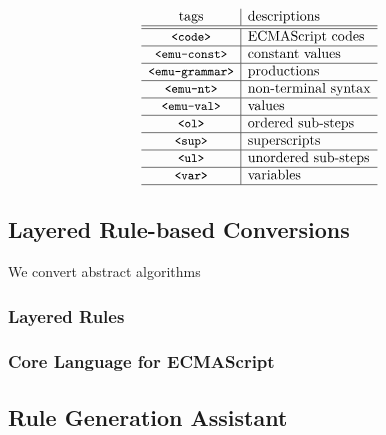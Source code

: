 \[
  \begin{array}{c|l}

    \text{tags} & \text{descriptions}\\\hline\hline
    \texttt{\small<code>} & \text{ECMAScript codes}\\\hline
    \texttt{\small<emu-const>} & \text{constant values}\\\hline
    \texttt{\small<emu-grammar>} & \text{productions}\\\hline
    \texttt{\small<emu-nt>} & \text{non-terminal syntax}\\\hline
    \texttt{\small<emu-val>} & \text{values}\\\hline
    \texttt{\small<ol>} & \text{ordered sub-steps}\\\hline
    \texttt{\small<sup>} & \text{superscripts}\\\hline
    \texttt{\small<ul>} & \text{unordered sub-steps}\\\hline
    \texttt{\small<var>} & \text{variables}\\\hline
  \end{array}
\]

\subsection{Layered Rule-based Conversions}

We convert abstract algorithms 

\subsubsection{Layered Rules}


\subsubsection{Core Language for ECMAScript}


\subsection{Rule Generation Assistant}















